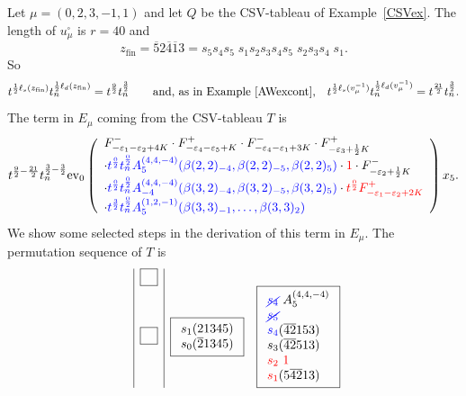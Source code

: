 \documentclass[11pt]{article}
\theoremstyle{plain}
\theoremstyle{definition}
\newenvironment{example}
  {\pushQED{\qed}\exampleinner}
  {\popQED\endexampleinner}
\theoremstyle{remark}
\numberwithin{equation}{section}
\def\ev{\mathrm{ev}}
\newcounter{r}
\newcounter{s}
\begin{document}
\begin{example} \label{CSVex2}
Let $\mu = (0,2,3,-1,1)$ and let $Q$ be the CSV-tableau of Example~\ref{CSVex}.  
The length of $u^\square_\mu$ is $r=40$ and
$$z_{\mathrm{fin}}= \overline{5}2\overline{4}\overline{1}3 = 
s_{5} s_{4} s_{5} \; s_{1} s_{2} s_{3} s_{4} s_{5} \; s_{2} s_{3} s_{4} \; s_{1}.
$$
So
$$t^{\frac12 \ell_s(z_{\mathrm{fin}})}t_n^{\frac12\ell_d(z_{\mathrm{fin}})}
=t^{\frac{9}{2}}t_n^{\frac{3}{2}}
\qquad\hbox{and, as in Example~\ref{AWexcont},}\quad
t^{\frac12\ell_s(v_\mu^{-1})}t_n^{\frac12\ell_d(v_\mu^{-1})} = t^{\frac{21}{2}}t_n^{\frac32}.
$$
The term in $E_\mu$ coming from the CSV-tableau $T$ is 
$$t^{\frac{9}{2}-\frac{21}{2}}t_n^{\frac{3}{2}-\frac32}\ev_0\left(
\begin{array}{l}
F^{-}_{-\varepsilon_1-\varepsilon_2+4K}
\cdot  F^+_{-\varepsilon_4-\varepsilon_5+K}
\cdot  F^-_{-\varepsilon_4-\varepsilon_1+3K}
\cdot  F^{+}_{-\varepsilon_3+\frac12K} \\
\cdot  {\color{blue} t^{\frac{0}{2}} t_{n}^{\frac{0}{2}} A^{(4, 4, -4)}_{5}(\beta(2,2)_{-4},\beta(2,2)_{-5},\beta(2,2)_{5})}
 \cdot {\color{red} 1} 
\cdot  F_{-\varepsilon_{2} + \frac{1}{2}K}^{-} \\
\cdot {\color{blue} t^{\frac{0}{2}} t_{n}^{\frac{0}{2}} A^{(4,4,-4)}_{-4}(\beta(3,2)_{-4},\beta(3,2)_{-5},\beta(3,2)_5)}
\cdot {\color{red} t^{\frac{0}{2}}  F_{-\varepsilon_{1} - \varepsilon_{2} + 2K}^{+}} \\
\cdot  {\color{blue} t^{\frac{3}{2}} t_{n}^{\frac{0}{2}} A^{(1,2,-1)}_{5}(\beta(3,3)_{-1},\ldots, \beta(3,3)_2)  }
\end{array}
\right)
x_5.
$$
We show some selected steps in the derivation of this term in $E_\mu$. 
The permutation sequence of $T$ is 
$$\begin{array}{c|c|ccccc}
&\boxed{\phantom{T} } & \\
&\boxed{\phantom{T} } &\boxed{
\begin{array}{l}
s_1(21345) \\
s_0(\overline{2}1345)
\end{array}
} 
&\boxed{
\begin{array}{l}
{\color{blue}{\cancel{s_4}}}\ A^{(4,4,-4)}_5\\
{\color{blue}{\cancel{s_5}}} \\
{\color{blue}{s_4}}(\overline{4}\overline{2}153) \\
s_3(\overline{4}\overline{2}513) \\
{\color{red}{s_2}\ 1}
\\
{\color{red}{s_1}}(5\overline{4}\overline{2}13) \\

\end{array}}
\end{array}$$
\end{example}
\end{document}

